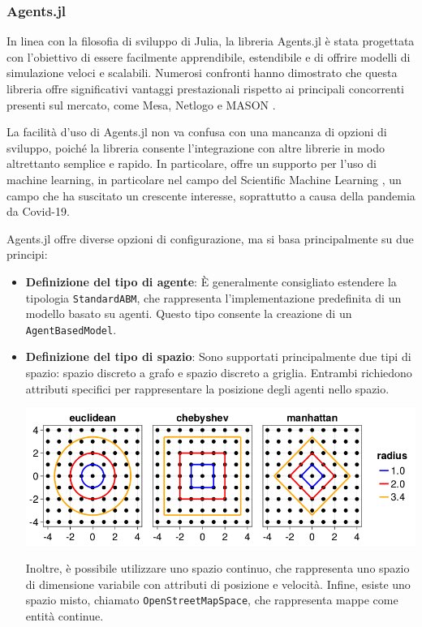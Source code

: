 \subsubsection{Agents.jl}

In linea con la filosofia di sviluppo di Julia, la libreria Agents.jl 
\cite{Agents.jl} è stata progettata con l'obiettivo di essere facilmente 
apprendibile, estendibile e di offrire modelli di simulazione veloci e 
scalabili. Numerosi confronti hanno dimostrato che questa libreria offre 
significativi vantaggi prestazionali rispetto ai principali concorrenti 
presenti sul mercato, come Mesa, Netlogo e MASON \cite{ABAR201713}.

La facilità d'uso di Agents.jl non va confusa con una mancanza di opzioni 
di sviluppo, poiché la libreria consente l'integrazione con altre 
librerie in modo altrettanto semplice e rapido. In particolare, offre un 
supporto per l'uso di machine learning, in particolare nel campo del 
Scientific Machine Learning \cite{rackauckas2017differentialequations}, 
un campo che ha suscitato un crescente interesse, soprattutto a 
causa della pandemia da Covid-19.

Agents.jl offre diverse opzioni di configurazione, ma si basa principalmente su due principi:

\begin{itemize}
    \item \textbf{Definizione del tipo di agente}: È generalmente 
    consigliato estendere la tipologia \texttt{StandardABM}, che rappresenta 
    l'implementazione predefinita di un modello basato su agenti. 
    Questo tipo consente la creazione di un \texttt{AgentBasedModel}.
    \item \textbf{Definizione del tipo di spazio}: Sono supportati 
    principalmente due tipi di spazio: spazio discreto a grafo 
    \cite{Graphs2021} e spazio discreto a griglia. Entrambi 
    richiedono attributi specifici per rappresentare la posizione degli 
    agenti nello spazio.

    \begin{minipage}{\linewidth}
        \centering
        \includegraphics[width=\textwidth]{img/distance.png}
        \label{fig:gridspace_distances}
    \end{minipage}

    Inoltre, è possibile utilizzare uno spazio continuo, che 
    rappresenta uno spazio di dimensione variabile con attributi di 
    posizione e velocità. Infine, esiste uno spazio misto, chiamato 
    \texttt{OpenStreetMapSpace}, che rappresenta mappe come entità continue.
\end{itemize}

